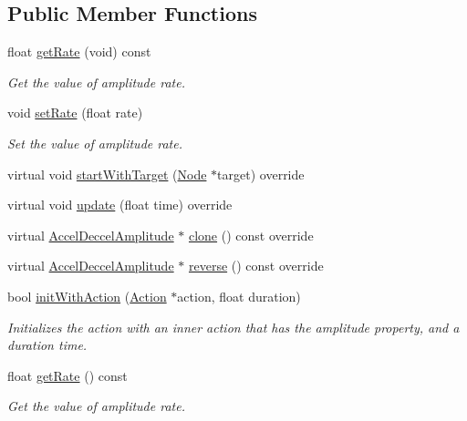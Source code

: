 \subsection*{Public Member Functions}
\begin{DoxyCompactItemize}
\item 
float \hyperlink{classAccelDeccelAmplitude_a59e265ad260758bfbea02a391c84bdf7}{get\+Rate} (void) const
\begin{DoxyCompactList}\small\item\em Get the value of amplitude rate. \end{DoxyCompactList}\item 
void \hyperlink{classAccelDeccelAmplitude_a296256081f994850630d8ea889edba4a}{set\+Rate} (float rate)
\begin{DoxyCompactList}\small\item\em Set the value of amplitude rate. \end{DoxyCompactList}\item 
virtual void \hyperlink{classAccelDeccelAmplitude_a1ceadaa1a00e4d4c360b0154fa7687ef}{start\+With\+Target} (\hyperlink{classNode}{Node} $\ast$target) override
\item 
virtual void \hyperlink{classAccelDeccelAmplitude_abc44a9707cdbf2356e8321d49f651df1}{update} (float time) override
\item 
virtual \hyperlink{classAccelDeccelAmplitude}{Accel\+Deccel\+Amplitude} $\ast$ \hyperlink{classAccelDeccelAmplitude_af2ced484fb1b0116de6ed8f787247805}{clone} () const override
\item 
virtual \hyperlink{classAccelDeccelAmplitude}{Accel\+Deccel\+Amplitude} $\ast$ \hyperlink{classAccelDeccelAmplitude_afd103ab39995dc66fe03853e7c937c45}{reverse} () const override
\item 
bool \hyperlink{classAccelDeccelAmplitude_add6f2f8561d00c2ef3f7802b951ec0ce}{init\+With\+Action} (\hyperlink{classAction}{Action} $\ast$action, float duration)
\begin{DoxyCompactList}\small\item\em Initializes the action with an inner action that has the amplitude property, and a duration time. \end{DoxyCompactList}\item 
float \hyperlink{classAccelDeccelAmplitude_a1e9ae0183222ba0d79ed6eb389fae96b}{get\+Rate} () const
\begin{DoxyCompactList}\small\item\em Get the value of amplitude rate. \end{DoxyCompactList}\item 

\end{DoxyCompactItemize}
